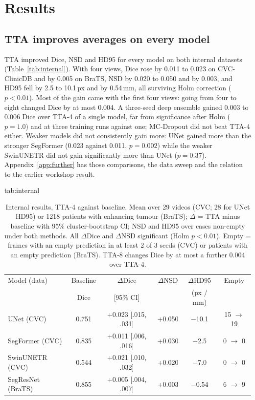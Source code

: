 \section{Results}
\label{sec:results}

\subsection{TTA improves averages on every model}
\label{sec:res-internal}
TTA improved Dice, NSD and HD95 for every model on both internal datasets (Table~\ref{tab:internal}). With four views, Dice rose by 0.011 to 0.023 on CVC-ClinicDB and by 0.005 on BraTS, NSD by 0.020 to 0.050 and by 0.003, and HD95 fell by 2.5 to 10.1\,px and by 0.54\,mm, all surviving Holm correction ($p<0.01$). Most of the gain came with the first four views: going from four to eight changed Dice by at most 0.004. A three-seed deep ensemble gained 0.003 to 0.006 Dice over TTA-4 of a single model, far from significance after Holm ($p=1.0$) and at three training runs against one; MC-Dropout did not beat TTA-4 either. Weaker models did not consistently gain more: UNet gained more than the stronger SegFormer (0.023 against 0.011, $p=0.002$) while the weaker SwinUNETR did not gain significantly more than UNet ($p=0.37$). Appendix~\ref{app:further} has those comparisons, the data sweep and the relation to the earlier workshop result.

\begin{table}[htbp]
\floatconts
  {tab:internal}%
  {\caption{Internal results, TTA-4 against baseline. Mean over 29 videos (CVC; 28 for UNet HD95) or 1218 patients with enhancing tumour (BraTS); $\Delta$ = TTA minus baseline with 95\% cluster-bootstrap CI; NSD and HD95 over cases non-empty under both methods. All $\Delta$Dice and $\Delta$NSD significant (Holm $p<0.01$). Empty = frames with an empty prediction in at least 2 of 3 seeds (CVC) or patients with an empty prediction (BraTS). TTA-8 changes Dice by at most a further 0.004 over TTA-4.}}%
  {
  \begin{tabular}{@{}lccccc@{}}
  \toprule
  Model (data) & Baseline & $\Delta$Dice & $\Delta$NSD & $\Delta$HD95 & Empty \\
   & Dice & [95\% CI] & & (px / mm) & \\
  \midrule
  UNet (CVC)        & 0.751 & +0.023 [.015, .031] & +0.050 & $-$10.1 & 15 $\rightarrow$ 19 \\
  SegFormer (CVC)   & 0.835 & +0.011 [.006, .016] & +0.030 & $-$2.5  & 0 $\rightarrow$ 0 \\
  SwinUNETR (CVC)   & 0.544 & +0.021 [.010, .032] & +0.020 & $-$7.0  & 0 $\rightarrow$ 0 \\
  SegResNet (BraTS) & 0.855 & +0.005 [.004, .007] & +0.003 & $-$0.54 & 6 $\rightarrow$ 9 \\
  \bottomrule
  \end{tabular}}
\end{table}

